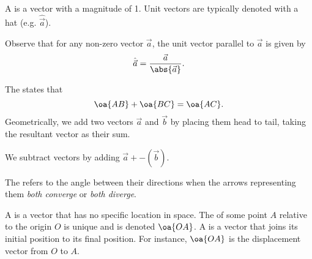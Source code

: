 \begin{definition}
    A  is a vector with a magnitude of 1. Unit vectors are typically denoted with a hat (e.g. $\hat{\vec a}$).
\end{definition}
Observe that for any non-zero vector $\vec a$, the unit vector parallel to $\vec a$ is given by \[\hat{\vec a} = \frac{\vec a}{\abs{\vec a}}.\]

\begin{definition}
    The  states that \[\oa{AB} + \oa{BC} = \oa{AC}.\] Geometrically, we add two vectors $\vec a$ and $\vec b$ by placing them head to tail, taking the resultant vector as their sum.

    \begin{figure}[H]
        \centering
        \caption{}
    \end{figure}

    We subtract vectors by adding $\vec a + -(\vec b)$.
\end{definition}

\begin{definition}
    The  refers to the angle between their directions when the arrows representing them \textit{both converge} or \textit{both diverge}.
\end{definition}

\begin{definition}
    A  is a vector that has no specific location in space. The  of some point $A$ relative to the origin $O$ is unique and is denoted $\oa{OA}$. A  is a vector that joins its initial position to its final position. For instance, $\oa{OA}$ is the displacement vector from $O$ to $A$.
\end{definition}


